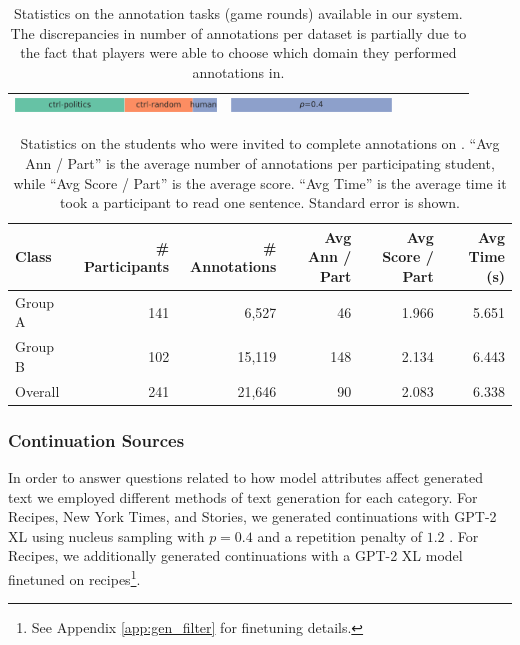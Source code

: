 \begin{table}[tb]
\begin{tabular}{l|r|rr|r|c|c}
\begin{minipage}{.275\textwidth}
      \includegraphics[height=1em]{figures/model_dist_presidential_speeches}
\end{minipage}
&
\begin{minipage}{.225\textwidth}
      \includegraphics[height=1em]{figures/decoding_dist_presidential_speeches}
\end{minipage}
\\
\bottomrule
\end{tabular}
\caption{Statistics on the annotation tasks (game rounds) available in our system. The discrepancies in number of annotations per dataset is partially due to the fact that players were able to choose which domain they performed annotations in.}
\label{tab:dataset_stats}
\end{table}

\begin{table}[tb]
\center
\small
\begin{tabular}{l|rrrrr}
\toprule
Class & \# Participants & \# Annotations & Avg Ann / Part & Avg Score / Part & Avg Time (s)\\
\midrule
Group A & 141 & 6,527 & 46 & 1.966 & {5.651} \\
Group B & 102 & 15,119 & 148 & 2.134 & {6.443} \\
\midrule
Overall & 241 & 21,646 & 90 & 2.083 & {6.338} \\
\bottomrule
\end{tabular}
\caption{Statistics on the students who were invited to complete annotations on \ROFT. ``Avg Ann / Part'' is the average number of annotations per participating student,  while ``Avg Score / Part'' is the average score. ``Avg Time'' is the average time it took a participant to read one sentence. Standard error is shown.
}
\label{tab:particpants}
\end{table}

\subsubsection{Continuation Sources}

In order to answer questions related to how model attributes affect generated text we employed different methods of text generation for each category.
For Recipes, New York Times, and Stories, we generated continuations with GPT-2 XL using nucleus sampling \citep{holtzmanetal2020} with $p=0.4$ and a repetition penalty of $1.2$ \citep{keskar2019ctrl}.
For Recipes, we additionally generated continuations with a GPT-2 XL model finetuned on recipes\footnote{See Appendix \ref{app:gen_filter} for finetuning details.}.


